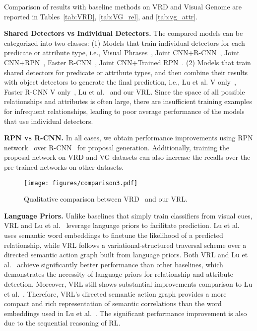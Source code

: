 \documentclass[10pt,twocolumn,letterpaper]{article}
\begin{document}
Comparison of results with baseline methods on VRD and {Visual} Genome are reported in Tables~\ref{tab:VRD}, \ref{tab:VG_rel}, and \ref{tab:vg_attr}.


\textbf{Shared Detectors vs Individual Detectors.} The compared models can be categorized into two classes: (1) {Models that train individual detectors for each predicate or attribute type, i.e.,} Visual Phrases~\cite{sadeghi2011recognition}, Joint CNN+R-CNN~\cite{simonyan2014very}, Joint CNN+RPN~\cite{simonyan2014very}, Faster R-CNN~\cite{ren2015faster}, Joint CNN+Trained RPN~\cite{ren2015faster}. (2) Models that train shared detectors for predicate or attribute types, and then combine their results with object detectors to generate the final prediction, i.e., Lu et al. V only~\cite{lu2016visual}, Faster R-CNN V only~\cite{ren2015faster}, Lu et al.~\cite{lu2016visual} and our VRL. Since the space of all possible relationships and attributes is often large, there are insufficient training examples for infrequent relationships, leading to poor average performance of the models that use individual detectors.

\textbf{RPN vs R-CNN.} In all cases, we obtain performance improvements using RPN network~\cite{ren2015faster} {over R-CNN}~\cite{girshick2014rich} for proposal generation. Additionally, training the proposal network on VRD and VG datasets can also increase the recalls over the pre-trained networks on other datasets.

\begin{figure}[!tp]
	\begin{center}
		\texttt{[image: figures/comparison3.pdf]}
		\caption{{Qualitative comparison between VRD~\cite{lu2016visual} and our VRL.}}
		\label{fig:comparison}
	\end{center}
	\vspace{-8mm}
\end{figure}


\textbf{Language Priors.} Unlike baselines that simply train classifiers from visual cues, VRL and Lu et al.~\cite{lu2016visual} leverage language priors to facilitate prediction. Lu et al.~\cite{lu2016visual} uses semantic word embeddings to finetune the likelihood of a predicted relationship, while VRL {follows} a variational-structured traversal scheme over a directed semantic action graph {built from language priors}. Both VRL and Lu et al.~\cite{lu2016visual} achieve significantly better performance than other baselines, which demonstrates the necessity of language priors for relationship and attribute detection. Moreover, VRL still shows substantial improvements comparison to Lu et al.~\cite{lu2016visual}. Therefore, VRL's directed semantic action graph provides a more compact and rich representation of semantic correlations than the word embeddings used in Lu et al.~\cite{lu2016visual}. The significant performance improvement is also {due to the sequential reasoning of RL.}
\end{document}
